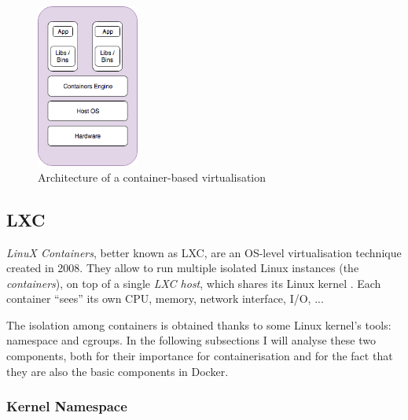 \documentclass[a4paper,12pt]{article}
\begin{document}
\begin{figure}[ht!]
  \centerline{\includegraphics[width=0.3\textwidth]{container_architecture.png}}
  \caption{Architecture of a container-based virtualisation}
  \label{fig:container_architecture}
  \end{figure}


\subsection{LXC}

\textit{LinuX Containers}, better known as LXC, are an OS-level virtualisation
technique created in 2008. They allow to run multiple isolated Linux instances
(the \textit{containers}), on top of a single \textit{LXC host}, which shares
its Linux kernel \cite{wikipedia_LXC}. Each container ``sees'' its own CPU,
memory, network interface, I/O, ... \par The isolation among containers is
obtained thanks to some Linux kernel's tools: namespace and cgroups. In the
following subsections I will analyse these two components, both for their
importance for containerisation and for the fact that they are also the basic
components in Docker.

\subsubsection{Kernel Namespace}
\end{document}
